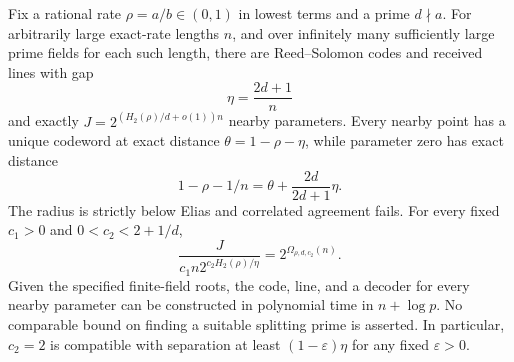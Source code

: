 \begin{theorem}
\label{tou:theorem}
Fix a rational rate $\rho=a/b\in(0,1)$ in lowest terms and a prime
$d\nmid a$. For arbitrarily large exact-rate lengths $n$, and over
infinitely many sufficiently large prime fields for each such length,
there are Reed--Solomon codes and received lines with gap
\[
 \eta=\frac{2d+1}{n}
\]
and exactly $J=2^{(H_2(\rho)/d+o(1))n}$ nearby parameters.
Every nearby point has a unique codeword at exact distance
$\theta=1-\rho-\eta$, while parameter zero has exact distance
\[
 1-\rho-1/n=\theta+\frac{2d}{2d+1}\eta.
\]
The radius is strictly below Elias and correlated agreement fails.
For every fixed $c_1>0$ and $0<c_2<2+1/d$,
\[
 \frac{J}{c_1n2^{c_2H_2(\rho)/\eta}}=2^{\Omega_{\rho,d,c_2}(n)}.
\]
Given the specified finite-field roots, the code, line, and a decoder
for every nearby parameter can be constructed in polynomial time in
$n+\log p$. No comparable bound on finding a suitable splitting prime
is asserted.
In particular, $c_2=2$ is compatible with separation at least
$(1-\varepsilon)\eta$ for any fixed $\varepsilon>0$.
\end{theorem}
